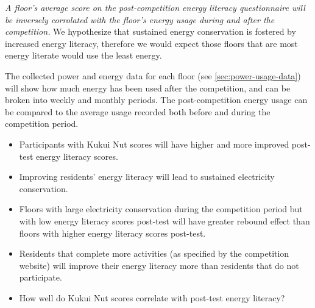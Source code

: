\emph{A floor's average score on the post-competition energy literacy questionnaire will be inversely corrolated with the floor's energy usage during and after the competition.} We hypothesize that sustained energy conservation is fostered by increased energy literacy, therefore we would expect those floors that are most energy literate would use the least energy.

The collected power and energy data for each floor (see \autoref{sec:power-usage-data}) will show how much energy has been used after the competition, and can be broken into weekly and monthly periods. The post-competition energy usage can be compared to the average usage recorded both before and during the competition period.

\begin{itemize}

\item Participants with Kukui Nut scores will have higher and more improved post-test energy literacy scores.

\item Improving residents' energy literacy will lead to sustained electricity conservation.

\item Floors with large electricity conservation during the competition period but with low energy literacy scores post-test will have greater rebound effect than floors with higher energy literacy scores post-test.

\item Residents that complete more activities (as specified by the competition website) will improve their energy literacy more than residents that do not participate.

\item How well do Kukui Nut scores correlate with post-test energy literacy?

\end{itemize}